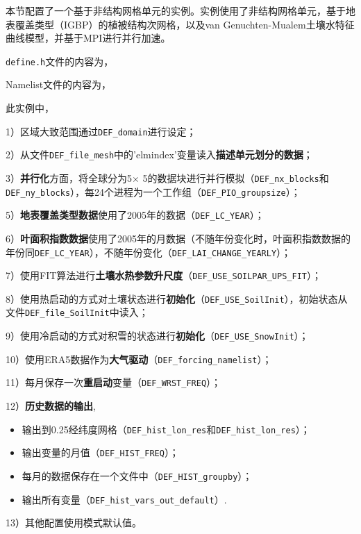 本节配置了一个基于非结构网格单元的实例。实例使用了非结构网格单元，基于地表覆盖类型（IGBP）的植被结构次网格，以及van Genuchten-Mualem土壤水特征曲线模型，并基于MPI进行并行加速。

\texttt{define.h}文件的内容为，


Namelist文件的内容为，


此实例中，\par
1）区域大致范围通过\texttt{DEF\_domain}进行设定；\par
2）从文件\texttt{DEF\_file\_mesh}中的'elmindex'变量读入\textbf{描述单元划分的数据}；\par
3）\textbf{并行化}方面，将全球分为5\textdegree$\times$ 5\textdegree 的数据块进行并行模拟（\texttt{DEF\_nx\_blocks}和\texttt{DEF\_ny\_blocks}），每24个进程为一个工作组（\texttt{DEF\_PIO\_groupsize}）；\par
5）\textbf{地表覆盖类型数据}使用了2005年的数据（\texttt{DEF\_LC\_YEAR}）；\par
6）\textbf{叶面积指数数据}使用了2005年的月数据（不随年份变化时，叶面积指数数据的年份同\texttt{DEF\_LC\_YEAR}），不随年份变化（\texttt{DEF\_LAI\_CHANGE\_YEARLY}）；\par
7）使用FIT算法进行\textbf{土壤水热参数升尺度}（\texttt{DEF\_USE\_SOILPAR\_UPS\_FIT}）；\par
8）使用热启动的方式对土壤状态进行\textbf{初始化}（\texttt{DEF\_USE\_SoilInit}），初始状态从文件\texttt{DEF\_file\_SoilInit}中读入；\par
9）使用冷启动的方式对积雪的状态进行\textbf{初始化}（\texttt{DEF\_USE\_SnowInit}）；\par
10）使用ERA5数据作为\textbf{大气驱动}（\texttt{DEF\_forcing\_namelist}）；\par
11）每月保存一次\textbf{重启动}变量（\texttt{DEF\_WRST\_FREQ}）；\par
12）\textbf{历史数据的输出},
\begin{itemize}[nosep,leftmargin=4em]
    \item 输出到0.25\textdegree 经纬度网格（\texttt{DEF\_hist\_lon\_res}和\texttt{DEF\_hist\_lon\_res}）；
    \item 输出变量的月值（\texttt{DEF\_HIST\_FREQ}）；
    \item 每月的数据保存在一个文件中（\texttt{DEF\_HIST\_groupby}）；
    \item 输出所有变量（\texttt{DEF\_hist\_vars\_out\_default}）.
\end{itemize}\par
13）其他配置使用模式默认值。

